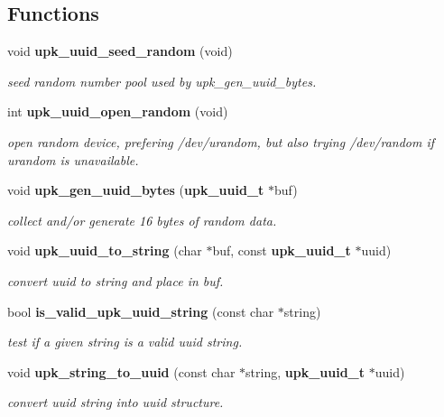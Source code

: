 \subsection*{Functions}
\begin{DoxyCompactItemize}
\item 
void {\bf upk\_\-uuid\_\-seed\_\-random} (void)
\begin{DoxyCompactList}\small\item\em seed random number pool used by upk\_\-gen\_\-uuid\_\-bytes. \end{DoxyCompactList}\item 
int {\bf upk\_\-uuid\_\-open\_\-random} (void)
\begin{DoxyCompactList}\small\item\em open random device, prefering /dev/urandom, but also trying /dev/random if urandom is unavailable. \end{DoxyCompactList}\item 
void {\bf upk\_\-gen\_\-uuid\_\-bytes} ({\bf upk\_\-uuid\_\-t} $\ast$buf)
\begin{DoxyCompactList}\small\item\em collect and/or generate 16 bytes of random data. \end{DoxyCompactList}\item 
void {\bf upk\_\-uuid\_\-to\_\-string} (char $\ast$buf, const {\bf upk\_\-uuid\_\-t} $\ast$uuid)
\begin{DoxyCompactList}\small\item\em convert uuid to string and place in buf. \end{DoxyCompactList}\item 
bool {\bf is\_\-valid\_\-upk\_\-uuid\_\-string} (const char $\ast$string)
\begin{DoxyCompactList}\small\item\em test if a given string is a valid uuid string. \end{DoxyCompactList}\item 
void {\bf upk\_\-string\_\-to\_\-uuid} (const char $\ast$string, {\bf upk\_\-uuid\_\-t} $\ast$uuid)
\begin{DoxyCompactList}\small\item\em convert uuid string into uuid structure. \end{DoxyCompactList}\end{DoxyCompactItemize}
